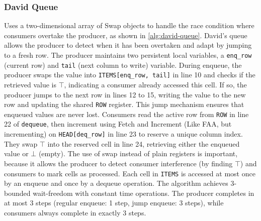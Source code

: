 \subsubsection{David Queue}\label{subsubsec:david-queue}
Uses a two-dimensional array of Swap objects to handle the race condition where consumers overtake the producer, as shown in \cref{alg:david-queue}. David's queue allows the producer to detect when it has been overtaken and adapt by jumping to a fresh row. The producer maintains two persistent local variables, a \texttt{enq\_row} (current row) and \texttt{tail} (next column to write) variable. During enqueue, the producer swaps the value into \texttt{ITEMS[enq\_row, tail]} in line 10 and checks if the retrieved value is $\top$, indicating a consumer already accessed this cell. If so, the producer jumps to the next row in lines 12 to 15, writing the value to the new row and updating the shared \texttt{ROW} register. This jump mechanism ensures that enqueued values are never lost. Consumers read the active row from \texttt{ROW} in line 22 of \texttt{dequeue}, then increment using Fetch and Increment (Like \ac{FAA}, but incrementing) on \texttt{HEAD[deq\_row]} in line 23 to reserve a unique column index. They swap $\top$ into the reserved cell in line 24, retrieving either the enqueued value or $\bot$ (empty). The use of swap instead of plain registers is important, because it allows the producer to detect consumer interference (by finding $\top$) and consumers to mark cells as processed. Each cell in \texttt{ITEMS} is accessed at most once by an enqueue and once by a dequeue operation. The algorithm achieves 3-bounded wait-freedom with constant time operations. The producer completes in at most 3 steps (regular enqueue: 1 step, jump enqueue: 3 steps), while consumers always complete in exactly 3 steps. \cite{Mateíspmc}

